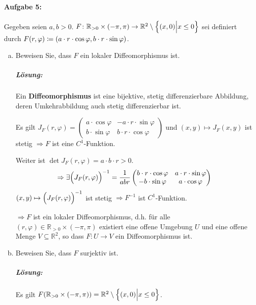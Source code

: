 \documentclass{scrreprt}
\begin{document}
\paragraph{Aufgabe 5:} Gegeben seien $a, b > 0$.
$F \colon \mathbb{R}_{> 0} \times \qty(-\pi, \pi) \to \mathbb{R}^2 \setminus \qty{(x, 0) {\Big |} x \leq 0}$
sei definiert durch $F(r, \varphi) \coloneqq \qty(a \cdot r \cdot \cos \varphi, b \cdot r \cdot \sin \varphi)$.
\begin{enumerate}[a)]
\item Beweisen Sie, dass $F$ ein lokaler Diffeomorphismus ist.

  \subparagraph{Lösung:} Ein \textbf{Diffeomorphismus} ist eine bijektive, stetig differenzierbare Abbildung,
  deren Umkehrabbildung auch stetig differenzierbar ist.

  Es gilt $J_F(r, \varphi) = \begin{pmatrix}
    a \cdot \cos \varphi & -a \cdot r \cdot \sin \varphi \\
    b \cdot \sin \varphi & b \cdot r \cdot \cos \varphi
  \end{pmatrix}$ und $(x, y) \mapsto J_F(x, y)$ ist stetig
  $\Rightarrow F$ ist eine $C^1$-Funktion.

  Weiter ist $\det J_F (r, \varphi) = a \cdot b \cdot r > 0$.
  \[
    \Rightarrow \exists \qty\Big(J_F(r, \varphi))^{-1}
    = \frac{1}{abr} \begin{pmatrix}
      b \cdot r \cdot \cos \varphi & a \cdot r \cdot \sin \varphi \\
      -b \cdot \sin \varphi & a \cdot \cos \varphi
    \end{pmatrix}
  \]
  $(x, y) \mapsto \qty\Big(J_F(r, \varphi))^{-1}$ ist stetig
  $\Rightarrow F^{-1}$ ist $C^1$-Funktion.

  $\Rightarrow F$ ist ein lokaler Diffeomorphismus, d.h. für alle
  $(r, \varphi) \in \mathbb{R}_{> 0} \times (-\pi, \pi)$ existiert eine
  offene Umgebung $U$ und eine offene Menge $V \subseteq \mathbb{R}^2$,
  so dass $F \colon U \to V$ ein Diffeomorphismus ist.

\item Beweisen Sie, dass $F$ surjektiv ist.

  \subparagraph{Lösung:} Es gilt $F(\mathbb{R}_{>0} \times (-\pi, \pi)) =
  \mathbb{R}^2 \setminus \qty{(x, 0) {\Big |} x \leq 0}$.


\end{enumerate}
\end{document}
